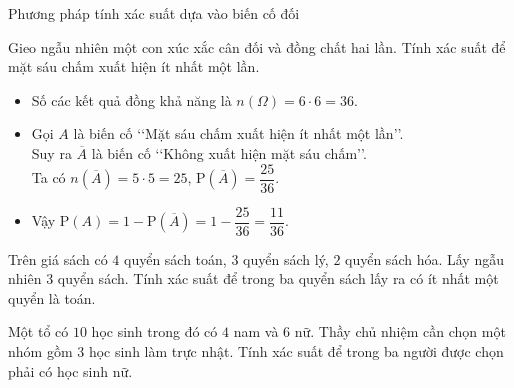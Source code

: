 \begin{dang}{Phương pháp tính xác suất dựa vào biến cố đối}
\end{dang}
\viduminhhoa
\setcounter{vd}{0}
\begin{vd}
	Gieo ngẫu nhiên một con xúc xắc cân đối và đồng chất hai lần. Tính xác suất để mặt sáu chấm xuất hiện ít nhất một lần.
	\loigiai
	{
		\begin{itemize}
			\item Số các kết quả đồng khả năng là $n(\Omega)=6\cdot 6=36$.
			\item Gọi $A$ là biến cố \lq\lq  Mặt sáu chấm xuất hiện ít nhất một lần\rq\rq.\\
			Suy ra $\overline{A}$ là biến cố \lq\lq  Không xuất hiện mặt sáu chấm\rq\rq .\\
			Ta có $n(\overline{A})=5\cdot 5=25$, $\mathrm{P}(\overline{A})=\dfrac{25}{36}$.
			\item Vậy $\mathrm{P}(A)=1-\mathrm{P}(\overline{A})=1-\dfrac{25}{36}=\dfrac{11}{36}$.
		\end{itemize}
	}
\end{vd}	
\begin{vd}
	Trên giá sách có $4$ quyển sách toán, $3$ quyển sách lý, $2$ quyển sách hóa. Lấy ngẫu nhiên $3$ quyển sách. Tính xác suất để trong ba quyển sách lấy ra có ít nhất một quyển là toán.
\end{vd}
\begin{vd}
	Một tổ có $10$ học sinh trong đó có $4$ nam và $6$ nữ. Thầy chủ nhiệm cần chọn một nhóm gồm $3$ học sinh làm trực nhật. Tính xác suất để trong ba người được chọn phải có học sinh nữ.
\end{vd}
